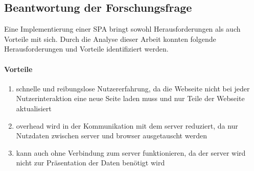 


\subsection{Beantwortung der Forschungsfrage}
Eine Implementierung einer \ac{SPA} bringt sowohl Herausforderungen als auch Vorteile mit sich.
Durch die Analyse dieser Arbeit konnten folgende Herausforderungen und Vorteile identifiziert werden.

\paragraph*{Vorteile}
\begin{enumerate}
    \item schnelle und reibungslose Nutzererfahrung, da die Webseite nicht bei jeder Nutzerinteraktion eine neue Seite laden muss und nur Teile der Webseite aktualisiert
    \item \gls{overhead} wird in der Kommunikation mit dem \gls{server} reduziert, da nur Nutzdaten zwischen \gls{server} und \gls{browser} ausgetauscht werden
    \item kann auch ohne Verbindung zum \gls{server} funktionieren, da der \gls{server} wird nicht zur Präsentation der Daten benötigt wird
\end{enumerate}

